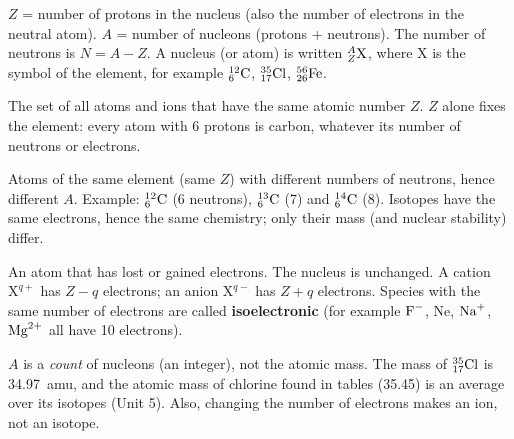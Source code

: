 \begin{concept}
$Z$ = number of protons in the nucleus (also the number of electrons in the neutral atom).
$A$ = number of nucleons (protons + neutrons). The number of neutrons is $N = A - Z$.
A nucleus (or atom) is written ${}^{A}_{Z}\mathrm{X}$, where X is the symbol of the element, for example
${}^{12}_{6}\mathrm{C}$, ${}^{35}_{17}\mathrm{Cl}$, ${}^{56}_{26}\mathrm{Fe}$.
\end{concept}
\begin{concept}
The set of all atoms and ions that have the same atomic number $Z$. $Z$ alone fixes the element:
every atom with 6 protons is carbon, whatever its number of neutrons or electrons.
\end{concept}
\begin{concept}[Isotopes.]
Atoms of the same element (same $Z$) with different numbers of neutrons, hence different $A$.
Example: ${}^{12}_{6}\mathrm{C}$ (6 neutrons), ${}^{13}_{6}\mathrm{C}$ (7) and ${}^{14}_{6}\mathrm{C}$ (8). Isotopes have the
same electrons, hence the same chemistry; only their mass (and nuclear stability) differ.
\end{concept}
\begin{concept}[Ions.]
An atom that has lost or gained electrons. The nucleus is unchanged. A cation $\mathrm{X}^{q+}$ has
$Z-q$ electrons; an anion $\mathrm{X}^{q-}$ has $Z+q$ electrons. Species with the same number of electrons
are called \textbf{isoelectronic} (for example $\ce{F-}$, Ne, $\ce{Na+}$, $\ce{Mg^2+}$ all have 10 electrons).
\end{concept}
\begin{trap}
$A$ is a \emph{count} of nucleons (an integer), not the atomic mass. The mass of ${}^{35}_{17}\mathrm{Cl}$ is
34.97~amu, and the atomic mass of chlorine found in tables (35.45) is an average over its isotopes
(Unit 5). Also, changing the number of electrons makes an ion, not an isotope.
\end{trap}

